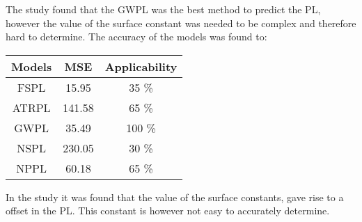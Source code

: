 \large



The study found that the GWPL was the best method to predict the PL, however the value of the surface constant was needed to be complex and therefore hard to determine. The accuracy of the models was found to:

\begin{center}
\begin{tabular}{|c|c|c|}
\hline
\textbf{Models} & \textbf{MSE} & \textbf{Applicability} \\ \hline
FSPL            & 15.95        & 35 \%                  \\ \hline
ATRPL 		    & 141.58       & 65 \%                  \\ \hline %
GWPL            & 35.49        & 100 \%                 \\ \hline
NSPL            & 230.05       & 30 \%                  \\ \hline
NPPL            & 60.18        & 65 \%                  \\ \hline
\end{tabular}
\end{center}


In the study it was found that the value of the surface constants, gave rise to a offset in the PL. This constant is however not easy to accurately determine. 

